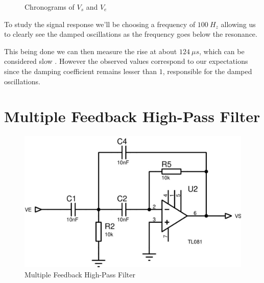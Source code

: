 \documentclass[11pt, openright]{book}
\begin{document}
\begin{figure}
  \caption{Chronograms of $V_s$ and $V_e$}
\end{figure}

To study the signal response we'll be choosing a frequency of $100\ H_z$ allowing us to clearly see the damped oscillations as the frequency goes below the resonance. 

This being done we can then measure the rise at about $124\ \mu s$, which can be considered slow . However the observed values correspond to our expectations since the damping coefficient remains lesser than $1$, responsible for the damped oscillations.

\newpage

\section{Multiple Feedback High-Pass Filter}

\begin{figure}[ht]
  \centering
  \includegraphics{./Circuits/C2.jpeg}
  \caption{Multiple Feedback High-Pass Filter}
\end{figure}
\end{document}
